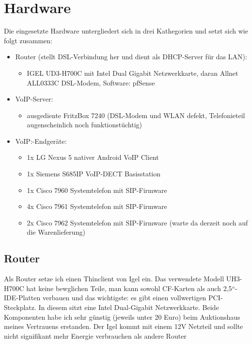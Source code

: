 \documentclass[a4paper,12pt]{scrbook}
\begin{document}
\chapter{Hardware}
\label{sec:1}

Die eingesetzte Hardware untergliedert sich in drei Kathegorien und setzt sich wie folgt zusammen:

\begin{itemize}
 \item Router (stellt DSL-Verbindung her und dient als DHCP-Server für das LAN):
 \begin{itemize}
  \item IGEL UD3-H700C mit Intel Dual Gigabit Netzwerkkarte, daran Allnet ALL0333C DSL-Modem, Software: pfSense
 \end{itemize}
 \item VoIP-Server: 
 \begin{itemize}
  \item ausgediente FritzBox 7240 (DSL-Modem und WLAN defekt, Telefonieteil augenscheinlich noch funktionstüchtig)
 \end{itemize}
 \item VoIP:-Endgeräte:
 \begin{itemize}
  \item 1x LG Nexus 5 nativer Android VoIP Client
  \item 1x Siemens S685IP VoIP-DECT Basisstation
  \item 1x Cisco 7960 Systemtelefon mit SIP-Firmware
  \item 4x Cisco 7961 Systemtelefon mit SIP-Firmware
  \item 2x Cisco 7962 Systemtelefon mit SIP-Firmware (warte da derzeit noch auf die Warenlieferung)
 \end{itemize}
\end{itemize}

\section{Router}
Als Router setze ich einen Thinclient von Igel ein. Das verwendete Modell UH3-H700C hat keine bewglichen Teile, 
man kann sowohl CF-Karten als auch 2,5``-IDE-Platten verbauen und das wichtigste: es gibt einen vollwertigen PCI-Steckplatz.
In diesem sitzt eine Intel Dual-Gigabit Netzwerkkarte. Beide Komponenten habe ich sehr günstig (jeweils unter 20 Euro) beim
Auktionshaus meines Vertrauens erstanden. Der Igel kommt mit einem 12V Netzteil und sollte nicht signifikant mehr Energie
verbrauchen als andere Router
\end{document}
